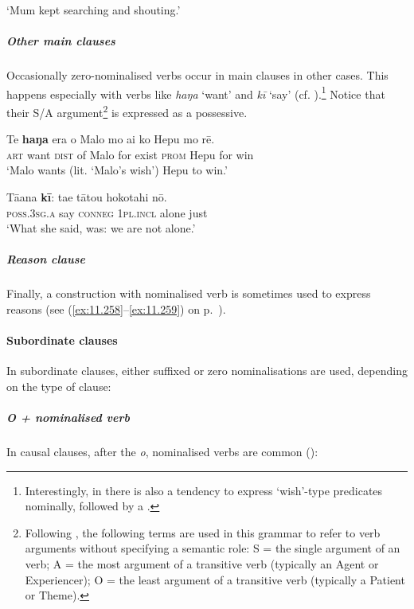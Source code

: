 \glt
‘Mum kept searching and shouting.’ \textstyleExampleref{[R236.082]} 
\z

\subparagraph{Other main clauses} Occasionally zero-nominalised verbs occur in main clauses in other cases. This happens especially with verbs like \textit{haŋa} ‘want’ and \textit{kī} ‘say’ (cf. ).\footnote{\label{fn:108}Interestingly, in  there is also a tendency to express ‘wish’-type predicates nominally, followed by a  \citep[459]{Bauer1993}.} Notice that their S/A argument\footnote{\label{fn:109}Following \citet{Comrie1978}, the following terms are used in this grammar to refer to verb arguments without specifying a semantic role: S = the single argument of an  verb; A = the most  argument of a transitive verb (typically an Agent or Experiencer); O = the least  argument of a transitive verb (typically a Patient or Theme).} is expressed as a possessive.

\ea\label{ex:3.26}
\gll Te \textbf{haŋa} era o Malo mo ai ko Hepu mo rē. \\
\textsc{art} want \textsc{dist} of Malo for exist \textsc{prom} Hepu for win \\

\glt 
‘Malo wants (lit. ‘Malo’s wish’) Hepu to win.’ \textstyleExampleref{[R408.064]} 
\z

\ea\label{ex:3.27}
\gll Tā{\ꞌ}ana \textbf{kī}: ta{\ꞌ}e tātou hokotahi nō. \\
\textsc{poss.3sg.a} say \textsc{conneg} \textsc{1pl.incl} alone just \\

\glt
‘What she said, was: we are not alone.’ \textstyleExampleref{[R649.191]} 
\z

\subparagraph{Reason clause} Finally, a construction with nominalised verb is sometimes used to express reasons (see (\ref{ex:11.258}–\ref{ex:11.259}) on p.~\pageref{ex:11.258}).

\paragraph{Subordinate clauses}\label{sec:3.2.3.1.2} In subordinate clauses, either suffixed or zero nominalisations are used, depending on the type of clause:

\subparagraph{\textit{{\ꞌ}O} + nominalised verb} In causal clauses, after the  \textit{{\ꞌ}o}, nominalised verbs are common ():


